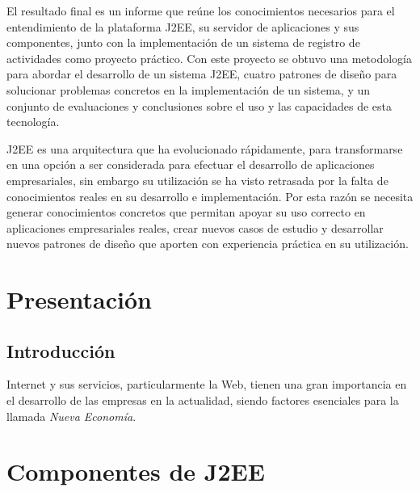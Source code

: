 \documentclass[12pt,oneside,letterpaper]{report}
\newcommand{\trm}[1]{\textit{#1}} %
\begin{document}

El resultado final es un informe que reúne los conocimientos necesarios
para el entendimiento de la plataforma J2EE, su servidor de aplicaciones y
sus componentes, junto con la implementación de un sistema de registro de
actividades como proyecto práctico. Con este proyecto se obtuvo una
metodología para abordar el desarrollo de un sistema J2EE, cuatro patrones
de diseño para solucionar problemas concretos en la implementación de un
sistema, y un conjunto de evaluaciones y conclusiones sobre el uso y las
capacidades de esta tecnología.


J2EE es una arquitectura que ha evolucionado rápidamente, para
transformarse en una opción a ser considerada para efectuar el desarrollo
de aplicaciones empresariales, sin embargo su utilización se ha visto
retrasada por la falta de conocimientos reales en su desarrollo e
implementación. Por esta razón se necesita generar conocimientos concretos
que permitan apoyar su uso correcto en aplicaciones empresariales reales,
crear nuevos casos de estudio y desarrollar nuevos patrones de diseño que
aporten con experiencia práctica en su utilización.


\newpage {}
\tableofcontents



\newpage
{}
\chapter{Presentación}

\section{Introducción}

Internet y sus servicios, particularmente la Web, tienen una gran
importancia en el desarrollo de las empresas en la actualidad, siendo
factores esenciales para la llamada \trm{Nueva Economía}.

\newpage
\chapter{Componentes de J2EE}
\end{document}
